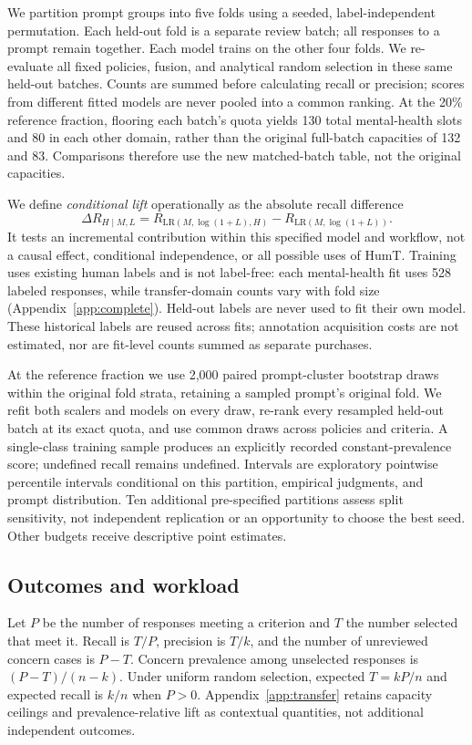 \documentclass[manuscript,screen,review,anonymous]{acmart}
\begin{document}
We partition prompt groups into five folds using a seeded, label-independent permutation. Each held-out fold is a separate review batch; all responses to a prompt remain together. Each model trains on the other four folds. We re-evaluate all fixed policies, fusion, and analytical random selection in these same held-out batches. Counts are summed before calculating recall or precision; scores from different fitted models are never pooled into a common ranking. At the 20\% reference fraction, flooring each batch's quota yields 130 total mental-health slots and 80 in each other domain, rather than the original full-batch capacities of 132 and 83. Comparisons therefore use the new matched-batch table, not the original capacities.

We define \emph{conditional lift} operationally as the absolute recall difference
\begin{equation}
\Delta R_{H\mid M,L}=R_{\mathrm{LR}(M,\log(1+L),H)}-R_{\mathrm{LR}(M,\log(1+L))}.
\end{equation}
It tests an incremental contribution within this specified model and workflow, not a causal effect, conditional independence, or all possible uses of HumT. Training uses existing human labels and is not label-free: each mental-health fit uses 528 labeled responses, while transfer-domain counts vary with fold size (Appendix~\ref{app:complete}). Held-out labels are never used to fit their own model. These historical labels are reused across fits; annotation acquisition costs are not estimated, nor are fit-level counts summed as separate purchases.

At the reference fraction we use 2,000 paired prompt-cluster bootstrap draws within the original fold strata, retaining a sampled prompt's original fold. We refit both scalers and models on every draw, re-rank every resampled held-out batch at its exact quota, and use common draws across policies and criteria. A single-class training sample produces an explicitly recorded constant-prevalence score; undefined recall remains undefined. Intervals are exploratory pointwise percentile intervals conditional on this partition, empirical judgments, and prompt distribution. Ten additional pre-specified partitions assess split sensitivity, not independent replication or an opportunity to choose the best seed. Other budgets receive descriptive point estimates.

\subsection{Outcomes and workload}
Let $P$ be the number of responses meeting a criterion and $T$ the number selected that meet it. Recall is $T/P$, precision is $T/k$, and the number of unreviewed concern cases is $P-T$. Concern prevalence among unselected responses is $(P-T)/(n-k)$. Under uniform random selection, expected $T=kP/n$ and expected recall is $k/n$ when $P>0$. Appendix~\ref{app:transfer} retains capacity ceilings and prevalence-relative lift as contextual quantities, not additional independent outcomes.
\end{document}
